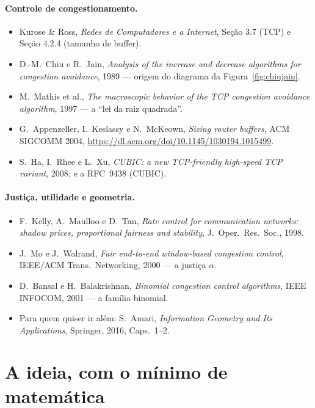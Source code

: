 \documentclass[11pt,a4paper]{article}
\begin{document}
\paragraph{Controle de congestionamento.}
\begin{itemize}
\item Kurose \& Ross, \emph{Redes de Computadores e a Internet}, Seção 3.7 (TCP) e
Seção 4.2.4 (tamanho de buffer).
\item D.-M.~Chiu e R.~Jain, \emph{Analysis of the increase and decrease algorithms for
congestion avoidance}, 1989 --- origem do diagrama da Figura~\ref{fig:chiujain}.
\item M.~Mathis et al., \emph{The macroscopic behavior of the TCP congestion avoidance
algorithm}, 1997 --- a “lei da raiz quadrada”.
\item G.~Appenzeller, I.~Keslassy e N.~McKeown, \emph{Sizing router buffers}, ACM
SIGCOMM 2004, \url{https://dl.acm.org/doi/10.1145/1030194.1015499}.
\item S.~Ha, I.~Rhee e L.~Xu, \emph{CUBIC: a new TCP-friendly high-speed TCP variant},
2008; e a RFC~9438 (CUBIC).
\end{itemize}

\paragraph{Justiça, utilidade e geometria.}
\begin{itemize}
\item F.~Kelly, A.~Maulloo e D.~Tan, \emph{Rate control for communication networks:
shadow prices, proportional fairness and stability}, J.~Oper.~Res.~Soc., 1998.
\item J.~Mo e J.~Walrand, \emph{Fair end-to-end window-based congestion control},
IEEE/ACM Trans.~Networking, 2000 --- a justiça $\alpha$.
\item D.~Bansal e H.~Balakrishnan, \emph{Binomial congestion control algorithms}, IEEE
INFOCOM, 2001 --- a família binomial.
\item Para quem quiser ir além: S.~Amari, \emph{Information Geometry and Its
Applications}, Springer, 2016, Caps.~1--2.
\end{itemize}

\section{A ideia, com o mínimo de matemática}
\label{sec:primer}
\end{document}

